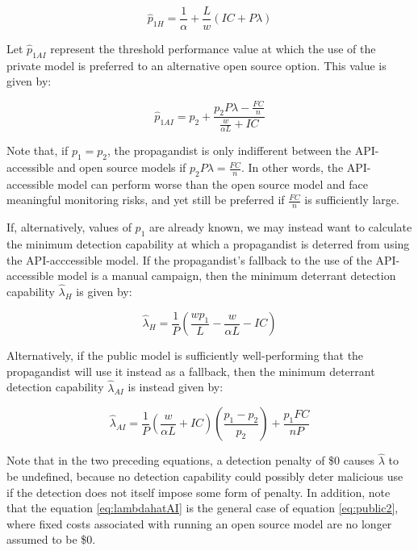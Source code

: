 \documentclass{article}
\begin{document}
\begin{equation}
  \hat{p}_{1H} = \frac{1}{\alpha} + \frac{L}{w} \left( IC + P \lambda \right)
\end{equation}

Let $\hat{p}_{1AI}$ represent the threshold performance value at which the use of the private model is preferred to an alternative open source option. This value is given by:

\begin{equation}
  \hat{p}_{1AI} = p_2 + \frac{p_2 P \lambda - \frac{FC}{n}}{\frac{w}{\alpha L} + IC} 
\end{equation}

Note that, if $p_1 = p_2$, the propagandist is only indifferent between the API-accessible and open source models if $p_2 P \lambda = \frac{FC}{n}$. In other words, the API-accessible model can perform worse than the open source model and face meaningful monitoring risks, and yet still be preferred if $\frac{FC}{n}$ is sufficiently large.  

If, alternatively, values of $p_1$ are already known, we may instead want to calculate the minimum detection capability at which a propagandist is deterred from using the API-acccessible model. If the propagandist's fallback to the use of the API-accessible model is a manual campaign, then the minimum deterrant detection capability $\hat{\lambda}_H$ is given by:  

\begin{equation}
  \hat{\lambda}_{H} = \frac{1}{P} \left( \frac{w p_1}{L} - \frac{w}{\alpha L} - IC \right)
\end{equation}

Alternatively, if the public model is sufficiently well-performing that the propagandist will use it instead as a fallback, then the minimum deterrant detection capability $\hat{\lambda}_{AI}$ is instead given by:

\begin{equation}
  \label{eq:lambdahatAI}
  \hat{\lambda}_{AI} = \frac{1}{P} \left( \frac{w}{\alpha L} + IC \right) \left( \frac{p_1 - p_2}{p_2} \right) + \frac{p_1 FC}{n P}
\end{equation}

Note that in the two preceding equations, a detection penalty of \$0 causes $\hat{\lambda}$ to be undefined, because no detection capability could possibly deter malicious use if the detection does not itself impose some form of penalty. In addition, note that the equation \ref{eq:lambdahatAI} is the general case of equation \ref{eq:public2}, where fixed costs associated with running an open source model are no longer assumed to be \$0.
\end{document}
